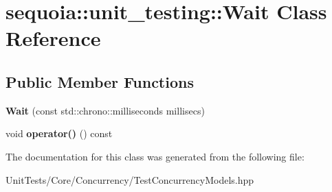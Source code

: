 \hypertarget{classsequoia_1_1unit__testing_1_1_wait}{}\section{sequoia\+::unit\+\_\+testing\+::Wait Class Reference}
\label{classsequoia_1_1unit__testing_1_1_wait}
\subsection*{Public Member Functions}
\begin{DoxyCompactItemize}
\item 
\mbox{\label{classsequoia_1_1unit__testing_1_1_wait_a6a81baa385b04fb569a799211c370f74}} 
{\bfseries Wait} (const std\+::chrono\+::milliseconds millisecs)
\item 
\mbox{\label{classsequoia_1_1unit__testing_1_1_wait_ad7c93f1c4497ae8e998a7bf21d2caed9}} 
void {\bfseries operator()} () const
\end{DoxyCompactItemize}


The documentation for this class was generated from the following file\+:\begin{DoxyCompactItemize}
\item 
Unit\+Tests/\+Core/\+Concurrency/Test\+Concurrency\+Models.\+hpp\end{DoxyCompactItemize}
